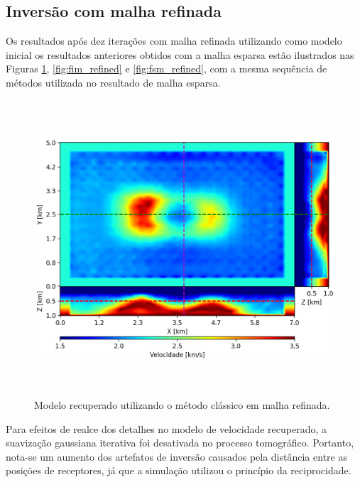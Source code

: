 \subsection*{Inversão com malha refinada}

Os resultados após dez iterações com malha refinada utilizando como modelo inicial os resultados anteriores obtidos com a malha esparsa estão ilustrados nas Figuras \ref{fig:pod_refined}, \ref{fig:fim_refined} e \ref{fig:fsm_refined}, com a mesma sequência de métodos utilizada no resultado de malha esparsa.

\begin{figure}[H]
	\centering
	\includegraphics[width=16cm,height=11cm]{Imgs/Resultados/pod_refined.png}
	\caption{Modelo recuperado utilizando o método clássico em malha refinada.}
	\label{fig:pod_refined}	
\end{figure}

Para efeitos de realce dos detalhes no modelo de velocidade recuperado, a suavização gaussiana iterativa foi desativada no processo tomográfico. Portanto, nota-se um aumento dos artefatos de inversão causados pela distância entre as posições de receptores, já que a simulação utilizou o princípio da reciprocidade.      

